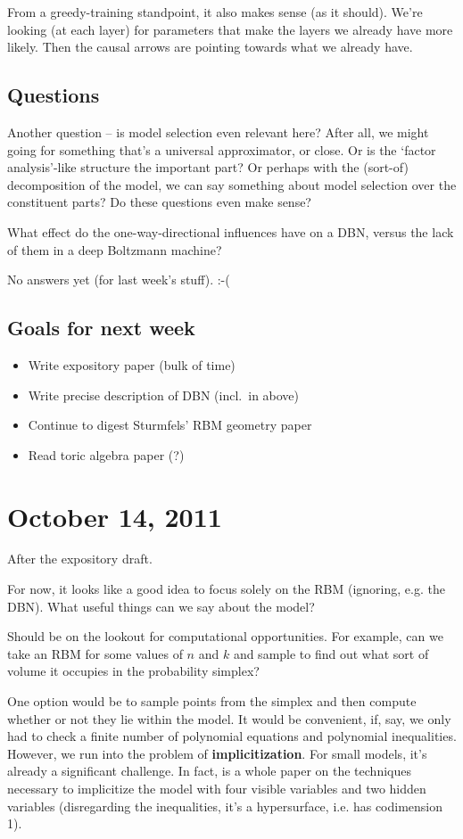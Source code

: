 \documentclass[11pt]{article}
\begin{document}
From a greedy-training standpoint, it also makes sense (as it should).  We're
looking (at each layer) for parameters that make the layers we already have more
likely.  Then the causal arrows are pointing towards what we already have.

\subsection{Questions}

Another question -- is model selection even relevant here?  After all, we might
going for something that's a universal approximator, or close.  Or is the
`factor analysis'-like structure the important part?  Or perhaps with the
(sort-of) decomposition of the model, we can say something about model selection
over the constituent parts?  Do these questions even make sense?

What effect do the one-way-directional influences have on a DBN, versus the lack
of them in a deep Boltzmann machine?

No answers yet (for last week's stuff). :-(


\subsection{Goals for next week}
\begin{itemize}
\item Write expository paper (bulk of time)
\item Write precise description of DBN (incl.\ in above)
\item Continue to digest Sturmfels' RBM geometry paper
\item Read toric algebra paper (?)
\end{itemize}

\section{October 14, 2011}

After the expository draft.

For now, it looks like a good idea to focus solely on the RBM (ignoring, e.g.
the DBN).  What useful things can we say about the model?

Should be on the lookout for computational opportunities.  For example, can we
take an RBM for some values of $n$ and $k$ and sample to find out what sort of
volume it occupies in the probability simplex?  

One option would be to sample points from the simplex and then compute whether
or not they lie within the model.  It would be convenient, if, say, we only had
to check a finite number of polynomial equations and polynomial inequalities.
However, we run into the problem of \textbf{implicitization}.  For small models,
it's already a significant challenge.  In fact, \cite{CTY10} is a whole paper on
the techniques necessary to implicitize the model with four visible variables
and two hidden variables (disregarding the inequalities, it's a hypersurface,
i.e. has codimension 1).
\end{document}
